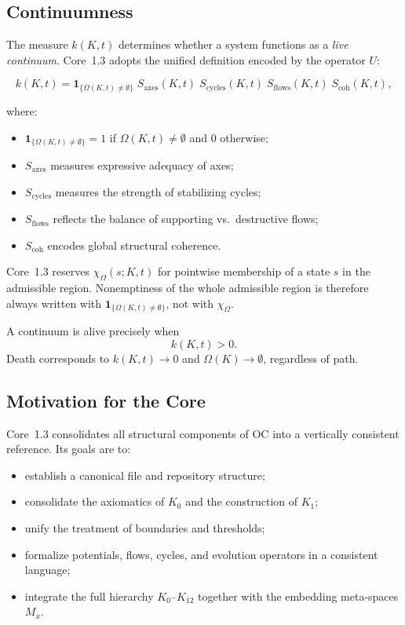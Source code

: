 \subsection{Continuumness}

The measure \(k(K,t)\) determines whether a system functions as a \emph{live continuum}.  
Core~1.3 adopts the unified definition encoded by the operator \(U\):

\[
k(K,t) =
\mathbf{1}_{\{\Omega(K,t)\neq\emptyset\}}\;
S_{\mathrm{axes}}(K,t)\;
S_{\mathrm{cycles}}(K,t)\;
S_{\mathrm{flows}}(K,t)\;
S_{\mathrm{coh}}(K,t),
\]

where:

\begin{itemize}
    \item \(\mathbf{1}_{\{\Omega(K,t)\neq\emptyset\}}=1\) if
          \(\Omega(K,t)\neq\emptyset\) and \(0\) otherwise;
    \item \(S_{\mathrm{axes}}\) measures expressive adequacy of axes;
    \item \(S_{\mathrm{cycles}}\) measures the strength of stabilizing cycles;
    \item \(S_{\mathrm{flows}}\) reflects the balance of supporting vs.\ destructive flows;
    \item \(S_{\mathrm{coh}}\) encodes global structural coherence.
\end{itemize}

Core~1.3 reserves \(\chi_{\Omega}(s;K,t)\) for pointwise membership of a
state \(s\) in the admissible region. Nonemptiness of the whole admissible
region is therefore always written with
\(\mathbf{1}_{\{\Omega(K,t)\neq\emptyset\}}\), not with \(\chi_{\Omega}\).

A continuum is alive precisely when
\[
k(K,t) > 0.
\]
Death corresponds to \(k(K,t)\to 0\) and \(\Omega(K)\to\emptyset\), regardless of path.

\subsection{Motivation for the Core}

Core~1.3 consolidates all structural components of OC into a vertically
consistent reference.
Its goals are to:

\begin{itemize}
    \item establish a canonical file and repository structure;
    \item consolidate the axiomatics of \(K_0\) and the construction of \(K_1\);
    \item unify the treatment of boundaries and thresholds;
    \item formalize potentials, flows, cycles, and evolution operators in a consistent language;
    \item integrate the full hierarchy \(K_0\)–\(K_{12}\) together with the embedding meta-spaces \(M_x\).
\end{itemize}

